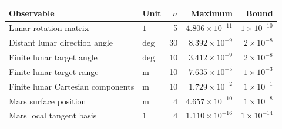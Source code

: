 \begin{tabularx}{\columnwidth}{@{}Ylrrr@{}}
\toprule
Observable & Unit & $n$ & Maximum & Bound \\
\midrule
Lunar rotation matrix & $1$ & 5 & $4.806\times10^{-11}$ & $1\times10^{-10}$ \\
Distant lunar direction angle & $\text{deg}$ & 30 & $8.392\times10^{-9}$ & $2\times10^{-8}$ \\
Finite lunar target angle & $\text{deg}$ & 10 & $3.412\times10^{-9}$ & $2\times10^{-8}$ \\
Finite lunar target range & $\mathrm{m}$ & 10 & $7.635\times10^{-5}$ & $1\times10^{-3}$ \\
Finite lunar Cartesian components & $\mathrm{m}$ & 10 & $1.729\times10^{-2}$ & $1\times10^{-1}$ \\
Mars surface position & $\mathrm{m}$ & 4 & $4.657\times10^{-10}$ & $1\times10^{-8}$ \\
Mars local tangent basis & $1$ & 4 & $1.110\times10^{-16}$ & $1\times10^{-14}$ \\
\bottomrule
\end{tabularx}
